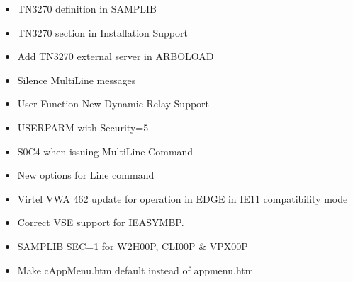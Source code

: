 \documentclass[letterpaper,10pt,english]{sphinxmanual}
\begin{document}
\begin{itemize}
\item {} 
 TN3270 definition in SAMPLIB

\item {} 
 TN3270 section in Installation Support

\item {} 
 Add TN3270 external server in ARBOLOAD

\item {} 
 Silence MultiLine messages

\item {} 
 User Function \sphinxhyphen{} New Dynamic Relay Support

\item {} 
 USERPARM with Security=5

\item {} 
 S0C4 when issuing Multi\sphinxhyphen{}Line Command

\item {} 
 New options for Line command

\item {} 
 Virtel VWA 462 update for operation in EDGE in IE11 compatibility mode

\item {} 
 Correct VSE support for IEASYMBP.

\item {} 
 SAMPLIB SEC=1 for W2H\sphinxhyphen{}00P, CLI\sphinxhyphen{}00P \& VPX\sphinxhyphen{}00P

\item {} 
 Make cAppMenu.htm default instead of appmenu.htm

\end{itemize}



\renewcommand{\indexname}{Index}
\printindex
\end{document}

